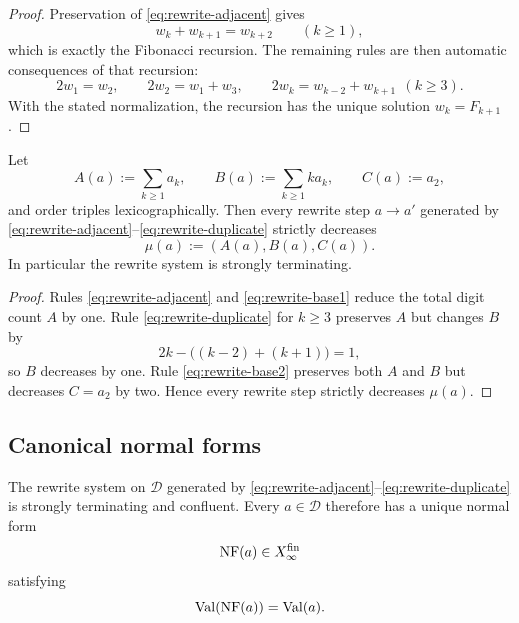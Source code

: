\begin{proof}
Preservation of \eqref{eq:rewrite-adjacent} gives
\[
w_k+w_{k+1}=w_{k+2}
\qquad (k\ge 1),
\]
which is exactly the Fibonacci recursion.  The remaining rules are then
automatic consequences of that recursion:
\[
2w_1=w_2,\qquad 2w_2=w_1+w_3,\qquad 2w_k=w_{k-2}+w_{k+1}\ \ (k\ge 3).
\]
With the stated normalization, the recursion has the unique solution
$w_k=F_{k+1}$.
\end{proof}

\begin{lemma}
\label{lem:local-weight-rigidity}
Let
\[
A(a):=\sum_{k\ge 1} a_k,
\qquad
B(a):=\sum_{k\ge 1} ka_k,
\qquad
C(a):=a_2,
\]
and order triples lexicographically.  Then every rewrite step
$a\to a'$ generated by \eqref{eq:rewrite-adjacent}--\eqref{eq:rewrite-duplicate}
strictly decreases
\[
\mu(a):=(A(a),B(a),C(a)).
\]
In particular the rewrite system is strongly terminating.
\end{lemma}

\begin{proof}
Rules \eqref{eq:rewrite-adjacent} and \eqref{eq:rewrite-base1} reduce the total
digit count $A$ by one.  Rule \eqref{eq:rewrite-duplicate} for $k\ge 3$
preserves $A$ but changes $B$ by
\[
2k-\bigl((k-2)+(k+1)\bigr)=1,
\]
so $B$ decreases by one.  Rule \eqref{eq:rewrite-base2} preserves both $A$ and
$B$ but decreases $C=a_2$ by two.  Hence every rewrite step strictly decreases
$\mu(a)$.
\end{proof}

\subsection{Canonical normal forms}

\begin{proposition}
\label{prop:rewrite-newman}
The rewrite system on $\mathcal D$ generated by
\eqref{eq:rewrite-adjacent}--\eqref{eq:rewrite-duplicate} is strongly
terminating and confluent.  Every $a\in\mathcal D$ therefore has a unique
normal form
\[
\operatorname{NF}(a)\in X_\infty^{\mathrm{fin}}
\]
satisfying
\[
\operatorname{Val}(\operatorname{NF}(a))=\operatorname{Val}(a).
\]
\end{proposition}

